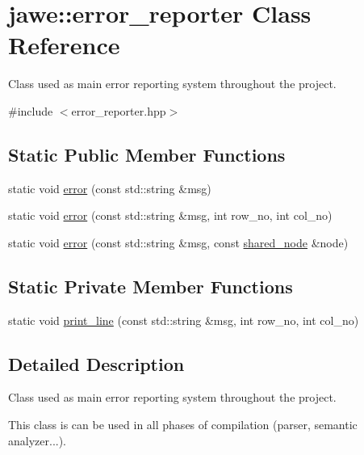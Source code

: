 \hypertarget{classjawe_1_1error__reporter}{}\section{jawe\+:\+:error\+\_\+reporter Class Reference}
\label{classjawe_1_1error__reporter}


Class used as main error reporting system throughout the project.  




{\ttfamily \#include $<$error\+\_\+reporter.\+hpp$>$}

\subsection*{Static Public Member Functions}
\begin{DoxyCompactItemize}
\item 
static void \hyperlink{classjawe_1_1error__reporter_acfa7b31326b9919ecdd1d1c13053c658}{error} (const std\+::string \&msg)
\item 
static void \hyperlink{classjawe_1_1error__reporter_a61739ea73525d07a47a1054ec3de88dc}{error} (const std\+::string \&msg, int row\+\_\+no, int col\+\_\+no)
\item 
static void \hyperlink{classjawe_1_1error__reporter_ad0ae5f6a65fb62897239a5efdf7d1d7b}{error} (const std\+::string \&msg, const \hyperlink{namespacejawe_a3f307481d921b6cbb50cc8511fc2b544}{shared\+\_\+node} \&node)
\end{DoxyCompactItemize}
\subsection*{Static Private Member Functions}
\begin{DoxyCompactItemize}
\item 
static void \hyperlink{classjawe_1_1error__reporter_afd5cdb8c419376a45200d2b93dddd20b}{print\+\_\+line} (const std\+::string \&msg, int row\+\_\+no, int col\+\_\+no)
\end{DoxyCompactItemize}


\subsection{Detailed Description}
Class used as main error reporting system throughout the project. 

This class is can be used in all phases of compilation (parser, semantic analyzer...). 

